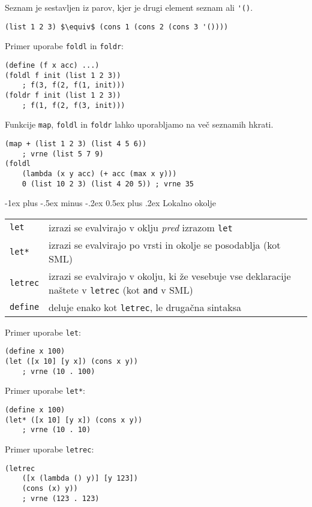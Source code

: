 \documentclass[a3paper,10pt]{extarticle}
\makeatletter
\renewcommand{\section}{\@startsection{section}{1}{0mm}%
                                {-1ex plus -.5ex minus -.2ex}%
                                {0.5ex plus .2ex}%
                                {\normalfont\large\bfseries}}
\makeatother
\begin{document}
\begin{multicols}{4}
Seznam je sestavljen iz parov, kjer je drugi element seznam ali \lstinline|'()|.
\begin{lstlisting}
(list 1 2 3) $\equiv$ (cons 1 (cons 2 (cons 3 '())))
\end{lstlisting}

Primer uporabe \lstinline|foldl| in \lstinline|foldr|:
\begin{lstlisting}
(define (f x acc) ...)
(foldl f init (list 1 2 3)) 
    ; f(3, f(2, f(1, init)))
(foldr f init (list 1 2 3)) 
    ; f(1, f(2, f(3, init)))
\end{lstlisting}

Funkcije \lstinline|map|, \lstinline|foldl| in \lstinline|foldr| lahko uporabljamo na več seznamih hkrati.
\begin{lstlisting}
(map + (list 1 2 3) (list 4 5 6)) 
    ; vrne (list 5 7 9)
(foldl 
    (lambda (x y acc) (+ acc (max x y))) 
    0 (list 10 2 3) (list 4 20 5)) ; vrne 35 
\end{lstlisting}

\section{Lokalno okolje}
\begin{tabular}{@{}lp{8cm}@{}}
    \lstinline|let| & izrazi se evalvirajo v oklju \textit{pred} izrazom \lstinline|let|\\
    \lstinline|let*| & izrazi se evalvirajo po vrsti in okolje se posodablja (kot SML)\\
    \lstinline|letrec| & izrazi se evalvirajo v okolju, ki že vesebuje vse deklaracije naštete v \lstinline|letrec| (kot \lstinline|and| v SML)\\
    \lstinline|define| & deluje enako kot \lstinline|letrec|, le drugačna sintaksa
\end{tabular}

Primer uporabe \lstinline|let|:
\begin{lstlisting}
(define x 100)
(let ([x 10] [y x]) (cons x y)) 
    ; vrne (10 . 100)
\end{lstlisting}

Primer uporabe \lstinline|let*|:
\begin{lstlisting}
(define x 100)
(let* ([x 10] [y x]) (cons x y)) 
    ; vrne (10 . 10)
\end{lstlisting}

Primer uporabe \lstinline|letrec|:
\begin{lstlisting}
(letrec 
    ([x (lambda () y)] [y 123]) 
    (cons (x) y)) 
    ; vrne (123 . 123)
\end{lstlisting}


\end{multicols}
\end{document}
